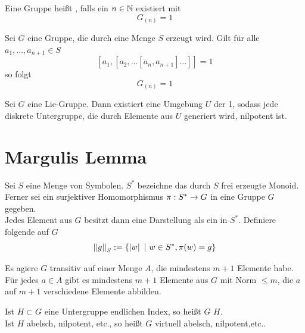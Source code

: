 \documentclass{book}
\begin{document}
\Def{}
Eine Gruppe heißt , falls ein $n \in \mathbb{N}$ existiert mit
\[ G_{(n)} = 1 \]

\Prop{}
Sei $G$ eine Gruppe, die durch eine Menge $S$ erzeugt wird. Gilt für alle $a_1,\ldots, a_{n+1} \in S$
\[ [a_1, [a_2,  \ldots [a_n, a_{n+1} ] \ldots ]] = 1 \]
so folgt
\[ G_{(n)} = 1 \]

\Lem{}
Sei $G$ eine Lie-Gruppe. Dann existiert eine Umgebung $U$ der 1, sodass jede diskrete Untergruppe, die durch Elemente aus $U$ generiert wird, nilpotent ist.

\section{Margulis Lemma}

\Def{}
Sei $S$ eine Menge von Symbolen. $S^*$ bezeichne das durch $S$ frei erzeugte Monoid. Ferner sei ein surjektiver Homomorphismus $\pi : S^* \overset{}{\rightarrow} G$ in eine Gruppe $G$ gegeben.\\
Jedes Element aus $G$ besitzt dann eine Darstellung als ein  in $S^*$. Definiere folgende  auf $G$
\[ \norm{g}_S := \set{\bet{w}}{w\in S^*, \pi(w) = g} \]

\Lem{}
Es agiere $G$ transitiv auf einer Menge $A$, die mindestens $m+1$ Elemente habe. Für jedes $a \in A$ gibt es mindestens $m+1$ Elemente aus $G$ mit Norm $\leq m$, die $a$ auf $m+1$ verschiedene Elemente abbilden.

\Def{}
Ist $H \subset G$ eine Untergruppe endlichen Index, so heißt $G$  $H$.\\
Ist $H$ abelsch, nilpotent, etc., so heißt $G$ virtuell abelsch, nilpotent,etc..
\end{document}
